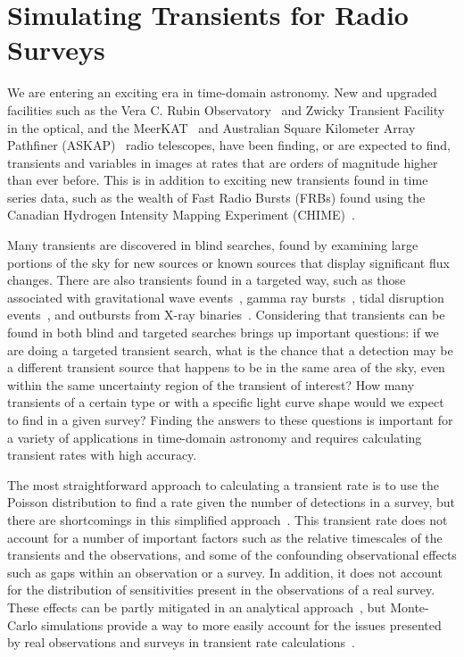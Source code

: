 \documentclass[12pt]{article}
\begin{document}
\newpage
\section{Simulating Transients for Radio Surveys}
\label{sec:transientsims}
\label{sec:sample1}

We are entering an exciting era in time-domain astronomy.  New and upgraded facilities such as the Vera C. Rubin Observatory~\citep{2019ApJ...873..111I} and Zwicky Transient Facility~\citep{2019PASP..131a8002B} in the optical, and the MeerKAT~\citep{2016mks..confE...1J} and Australian Square Kilometer Array Pathfiner (ASKAP)~\citep{2021PASA...38...54M} radio telescopes, have been finding, or are expected to find, transients and variables in images at rates that are orders of magnitude higher than ever before. This is in addition to exciting new transients found in time series data, such as the wealth of Fast Radio Bursts (FRBs) found using the Canadian Hydrogen Intensity Mapping Experiment (CHIME)~\citep{2019Natur.566..235C}. 

Many transients are discovered in blind searches, found by examining large portions of the sky for new sources or known sources that display significant flux changes. There are also transients found in a targeted way, such as those associated with gravitational wave events~\citep{2017PhRvL.119p1101A,2017Natur.551...71T,2018ApJ...868L..11M}, gamma ray bursts~\citep{1997Natur.389..261F,2018MNRAS.473.1512A}, tidal disruption events~\citep{2011Sci...333..199L,2016Sci...351...62V}, and outbursts from X-ray binaries~\citep{2004MNRAS.355.1105F,2017MNRAS.469.3141T}. Considering that transients can be found in both blind and targeted searches brings up important questions: if we are doing a targeted transient search, what is the chance that a detection may be a different transient source that happens to be in the same area of the sky, even within the same uncertainty region of the transient of interest? How many transients of a certain type or with a specific light curve shape would we expect to find in a given survey? Finding the answers to these questions is important for a variety of applications in time-domain astronomy and requires calculating transient rates with high accuracy. 

The most straightforward approach to calculating a transient rate is to use the Poisson distribution to find a rate given the number of detections in a survey, but there are shortcomings in this simplified approach~\citep{2016MNRAS.459.3161C}. This transient rate does not account for a number of important factors such as the relative timescales of the transients and the observations, and some of the confounding observational effects such as gaps within an observation or a survey. In addition, it does not account for the distribution of sensitivities present in the observations of a real survey. These effects can be partly mitigated in an analytical approach~\citep{2016MNRAS.459.3161C}, but Monte-Carlo simulations provide a way to more easily account for the issues presented by real observations and surveys in transient rate calculations~\citep{2017MNRAS.465.4106C}. 
\end{document}
